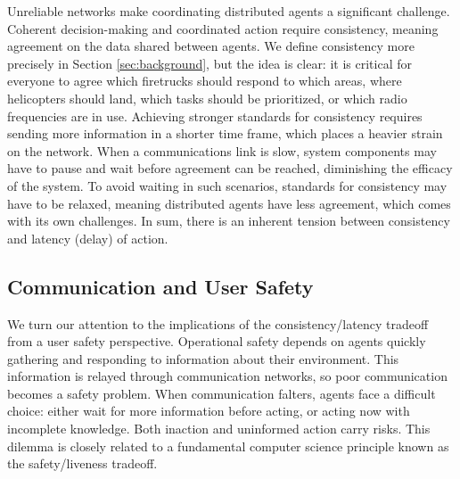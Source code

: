 \documentclass[]             %
{NASA}                       %
\theoremstyle{definition}
\begin{document}
Unreliable networks make coordinating distributed agents a significant
challenge. Coherent decision-making and coordinated action require
consistency, meaning agreement on the data shared between agents. We
define consistency more precisely in Section \ref{sec:background}, but
the idea is clear: it is critical for everyone to agree which
firetrucks should respond to which areas, where helicopters should
land, which tasks should be prioritized, or which radio frequencies
are in use. Achieving stronger standards for consistency requires
sending more information in a shorter time frame, which places a
heavier strain on the network. When a communications link is slow,
system components may have to pause and wait before agreement can be
reached, diminishing the efficacy of the system. To avoid waiting in
such scenarios, standards for consistency may have to be relaxed,
meaning distributed agents have less agreement, which comes with its
own challenges. In sum, there is an inherent tension between
consistency and latency (delay) of action.

\subsection{Communication and User Safety}
\label{ssec:communication-and-safety}
We turn our attention to the implications of the consistency/latency
tradeoff from a user safety perspective. Operational safety depends on
agents quickly gathering and responding to information about their
environment. This information is relayed through communication
networks, so poor communication becomes a safety problem. When
communication falters, agents face a difficult choice: either wait for
more information before acting, or acting now with incomplete
knowledge. Both inaction and uninformed action carry risks. This
dilemma is closely related to a fundamental computer science principle
known as the safety/liveness tradeoff.
\end{document}
